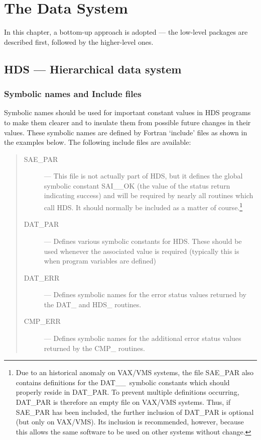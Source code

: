 \chapter{The Data System}
\label{C_datsys}

In this chapter, a bottom-up approach is adopted --- the low-level packages are
described first, followed by the higher-level ones.

\section{HDS --- Hierarchical data system}
\label{S_usehds}

\subsection{Symbolic names and Include files}

Symbolic names should be used for important constant values in HDS programs to
make them clearer and to insulate them from possible future changes in their
values.
These symbolic names are defined by Fortran `include' files as shown in the
examples below.
The following include files are available:

\begin{quote}
\begin{description}

\item [SAE\_PAR] ---
This file is not actually part of HDS, but it defines the global symbolic
constant SAI\_\_OK (the value of the status return indicating success) and will
be required by nearly all routines which call HDS.
It should normally be included as a matter of course.\footnote{Due to an
historical anomaly on VAX/VMS systems, the file SAE\_PAR also contains
definitions for the DAT\_\_\, symbolic constants which should properly reside
in DAT\_PAR.
To prevent multiple definitions occurring, DAT\_PAR is therefore an empty file
on VAX/VMS systems.
Thus, if SAE\_PAR has been included, the further inclusion of DAT\_PAR is
optional (but only on VAX/VMS).
Its inclusion is recommended, however, because this allows the same software
to be used on other systems without change.}

\item [DAT\_PAR] ---
Defines various symbolic constants for HDS.
These should be used whenever the associated value is required (typically this
is when program variables are defined)

\item [DAT\_ERR] ---
Defines symbolic names for the error status values returned by the DAT\_
and HDS\_ routines.

\item [CMP\_ERR] ---
Defines symbolic names for the additional error status values returned by
the CMP\_ routines.
\end{description}
\end{quote}

